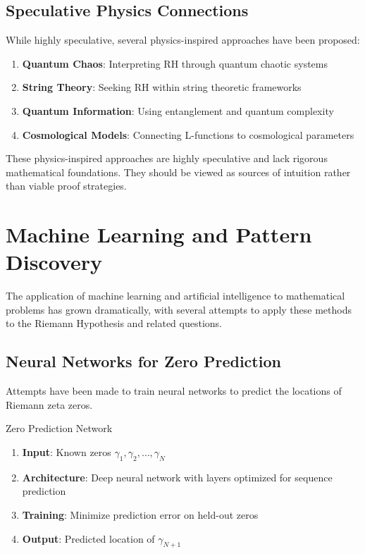 \subsection{Speculative Physics Connections}

While highly speculative, several physics-inspired approaches have been proposed:

\begin{enumerate}
\item \textbf{Quantum Chaos}: Interpreting RH through quantum chaotic systems
\item \textbf{String Theory}: Seeking RH within string theoretic frameworks
\item \textbf{Quantum Information}: Using entanglement and quantum complexity
\item \textbf{Cosmological Models}: Connecting L-functions to cosmological parameters
\end{enumerate}

\begin{warning}
These physics-inspired approaches are highly speculative and lack rigorous mathematical foundations. They should be viewed as sources of intuition rather than viable proof strategies.
\end{warning}

\section{Machine Learning and Pattern Discovery}
\label{sec:machine_learning}

The application of machine learning and artificial intelligence to mathematical problems has grown dramatically, with several attempts to apply these methods to the Riemann Hypothesis and related questions.

\subsection{Neural Networks for Zero Prediction}

Attempts have been made to train neural networks to predict the locations of Riemann zeta zeros.

\begin{algorithm}
\caption{Zero Prediction Network}
\label{alg:zero_prediction}
\begin{enumerate}
\item \textbf{Input}: Known zeros $\gamma_1, \gamma_2, \ldots, \gamma_N$
\item \textbf{Architecture}: Deep neural network with layers optimized for sequence prediction
\item \textbf{Training}: Minimize prediction error on held-out zeros
\item \textbf{Output}: Predicted location of $\gamma_{N+1}$
\end{enumerate}
\end{algorithm}

